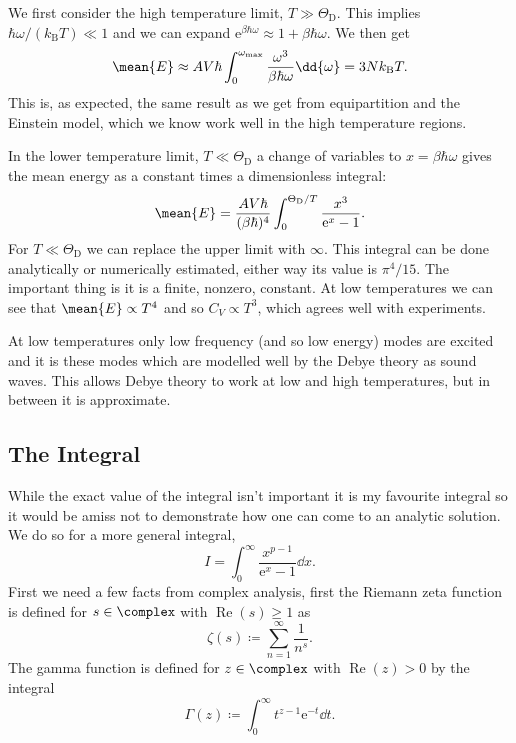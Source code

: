 \documentclass[fleqn]{NotesClass}
\newcommand*{\boltzmann}{k_{\mathrm{B}}}
\newcommand*{\e}{\mathrm{e}}
\DeclareMathOperator{\Re}{Re}
\begin{document}
    We first consider the high temperature limit, \(T \gg \Theta_{\mathrm{D}}\).
    This implies \(\hbar\omega/(\boltzmann T) \ll 1\) and we can expand \(\e^{\beta\hbar\omega} \approx 1 + \beta\hbar\omega\).
    We then get
    \begin{equation}
        \mean{E} \approx AV\hbar \int_{0}^{\omega_{\mathrm{max}}} \frac{\omega^3}{\beta\hbar\omega} \dd{\omega} = 3N\boltzmann T.
    \end{equation}
    This is, as expected, the same result as we get from equipartition and the Einstein model, which we know work well in the high temperature regions.
    
    In the lower temperature limit, \(T \ll \Theta_{\mathrm{D}}\) a change of variables to \(x = \beta\hbar\omega\) gives the mean energy as a constant times a dimensionless integral:
    \begin{equation}
        \mean{E} = \frac{AV\hbar}{(\beta\hbar)^4} \int_{0}^{\Theta_{\mathrm{D}}/T} \frac{x^3}{\e^{x} - 1}.
    \end{equation}
    For \(T \ll \Theta_{\mathrm{D}}\) we can replace the upper limit with \(\infty\).
    This integral can be done analytically or numerically estimated, either way its value is \(\pi^4/15\).
    The important thing is it is a finite, nonzero, constant.
    At low temperatures we can see that \(\mean{E} \propto T^4\) and so \(C_V \propto T^3\), which agrees well with experiments.
    
    At low temperatures only low frequency (and so low energy) modes are excited and it is these modes which are modelled well by the Debye theory as sound waves.
    This allows Debye theory to work at low and high temperatures, but in between it is approximate.
    
    \subsection{The Integral}
    While the exact value of the integral isn't important it is my favourite integral so it would be amiss not to demonstrate how one can come to an analytic solution.
    We do so for a more general integral,
    \begin{equation}
        I = \int_{0}^{\infty} \frac{x^{p - 1}}{\e^{x} - 1} \dd{x}.
    \end{equation}
    First we need a few facts from complex analysis, first the Riemann zeta function is defined for \(s\in\complex\) with \(\Re(s) \ge 1\) as
    \begin{equation}
        \zeta(s) \coloneqq \sum_{n = 1}^{\infty} \frac{1}{n^s}.
    \end{equation}
    The gamma function is defined for \(z \in \complex\) with \(\Re(z) > 0\) by the integral
    \begin{equation}
        \Gamma(z) \coloneqq \int_{0}^{\infty} t^{z - 1} \e^{-t} \dd{t}.
    \end{equation}
    
\end{document}
